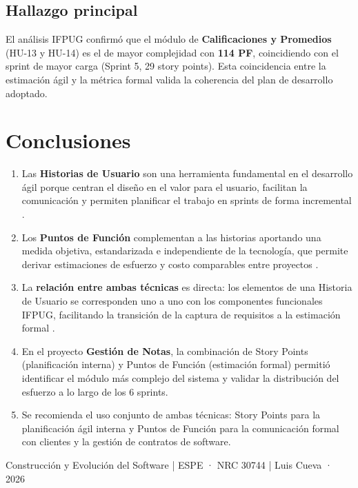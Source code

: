 \documentclass[12pt, a4paper]{article}
\begin{document}
\subsection{Hallazgo principal}

El análisis IFPUG confirmó que el módulo de \textbf{Calificaciones y Promedios}
(HU-13 y HU-14) es el de mayor complejidad con \textbf{114 PF}, coincidiendo
con el sprint de mayor carga (Sprint 5, 29 story points). Esta coincidencia
entre la estimación ágil y la métrica formal valida la coherencia del
plan de desarrollo adoptado.

\section{Conclusiones}

\begin{enumerate}[leftmargin=1.8cm, itemsep=4pt]
  \item Las \textbf{Historias de Usuario} son una herramienta fundamental en el
        desarrollo ágil porque centran el diseño en el valor para el usuario,
        facilitan la comunicación y permiten planificar el trabajo en sprints de
        forma incremental \parencite{cohn2004}.

  \item Los \textbf{Puntos de Función} complementan a las historias aportando
        una medida objetiva, estandarizada e independiente de la tecnología,
        que permite derivar estimaciones de esfuerzo y costo comparables
        entre proyectos \parencite{ifpug2010}.

  \item La \textbf{relación entre ambas técnicas} es directa: los elementos de
        una Historia de Usuario se corresponden uno a uno con los componentes
        funcionales IFPUG, facilitando la transición de la captura de requisitos
        a la estimación formal \parencite{sommerville2016}.

  \item En el proyecto \textbf{Gestión de Notas}, la combinación de Story Points
        (planificación interna) y Puntos de Función (estimación formal) permitió
        identificar el módulo más complejo del sistema y validar la distribución
        del esfuerzo a lo largo de los 6 sprints.

  \item Se recomienda el uso conjunto de ambas técnicas: Story Points para la
        planificación ágil interna y Puntos de Función para la comunicación
        formal con clientes y la gestión de contratos de software.
\end{enumerate}

\newpage
\printbibliography[title={Referencias}]

\vfill
\begin{center}
  \small\color{grisoscuro}
  Construcción y Evolución del Software \quad|\quad
  ESPE · NRC 30744 \quad|\quad
  Luis Cueva · 2026
\end{center}
\end{document}
